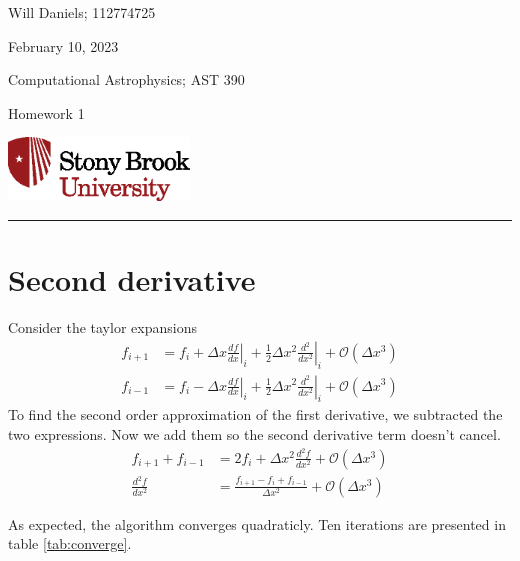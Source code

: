 \documentclass[12pt, letterpaper]{article}
\begin{document}
\noindent
\begin{minipage}{0.5\textwidth}
    Will Daniels; 112774725

    February 10, 2023

    Computational Astrophysics; AST 390

    Homework 1
\end{minipage}
%
\begin{minipage}{0.5\textwidth}
    \begin{flushright}
        \includegraphics[height = 48pt]{SBULogoStacked}
    \end{flushright}
\end{minipage}
\noindent
\rule{\textwidth}{1pt}

\tableofcontents

\section{Second derivative}
Consider the taylor expansions
\begin{align}
    f_{i+1} &=
    f_i +
    \Delta x \left. \frac{df}{dx} \right|_i +
    \frac{1}{2} \Delta x^2 \left. \frac{d^2}{dx^2} \right|_i +
    \mathcal{O} \left(\Delta x^3 \right)
    \\
    f_{i-1} &=
    f_i -
    \Delta x \left. \frac{df}{dx} \right|_i +
    \frac{1}{2} \Delta x^2 \left. \frac{d^2}{dx^2} \right|_i +
    \mathcal{O} \left(\Delta x^3 \right)
\end{align}
To find the second order approximation of the first derivative, we
subtracted the two expressions. Now we add them so the second derivative
term doesn't cancel.
\begin{align}
    f_{i+1} + f_{i-1}
    &=
    2 f_i +
    \Delta x^2 \frac{d^2f}{dx^2} +
    \mathcal{O} \left( \Delta x^3 \right)
    \\
    \frac{d^2f}{dx^2}
    &=
    \frac{f_{i+1} - f_i + f_{i-1}}{\Delta x^2} +
    \mathcal{O} \left( \Delta x^3 \right)
\end{align}

As expected, the algorithm converges quadraticly. Ten iterations are presented
in table \ref{tab:converge}.
\end{document}
